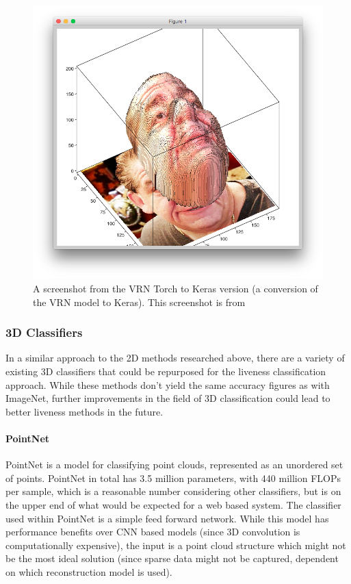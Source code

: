 \documentclass[11pt,a4paper]{article}
\begin{document}
            \begin{figure}
                \centering
                \includegraphics[width=.5\linewidth]{3DReconstructionFromSource}
                \caption{A screenshot from the VRN Torch to Keras version (a conversion of the VRN model to Keras). This screenshot is from \cite{VRNTorchToKeras}}
                \label{3DReconstructionScreenshot}
            \end{figure}


        \subsubsection{3D Classifiers}
            In a similar approach to the 2D methods researched above, there are a variety of existing 3D classifiers that could be repurposed for the liveness classification approach.
            While these methods don't yield the same accuracy figures as with ImageNet, further improvements in the field of 3D classification could lead to better liveness methods in the future.

            \paragraph{PointNet}
                PointNet is a model for classifying point clouds, represented as an unordered set of points. PointNet in total has 3.5 million parameters, with 440 million FLOPs per sample, which 
                is a reasonable number considering other classifiers, but is on the upper end of what would be expected for a web based system. The classifier used within PointNet is a simple feed forward network.
                \cite{PointNet}
                While this model has performance benefits over CNN based models (since 3D convolution is computationally expensive),
                the input is a point cloud structure which might not be the most ideal solution (since sparse data might not be captured, dependent on which reconstruction model is used).
\end{document}
